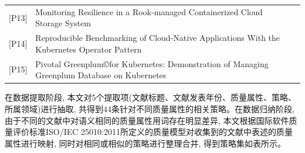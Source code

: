{\begin{longtable}[h]{m{40pt} m{280pt} m{40pt}<{\centering}}
        [P13]&Monitoring Resilience in a Rook-managed Containerized Cloud Storage System&\cite{baumann2019monitoring}\\
        
        [P14]&Reproducible Benchmarking of Cloud-Native Applications With the Kubernetes Operator Pattern&\cite{henning2021reproducible}\\
        
        [P15]&Pivotal Greenplum©for Kubernetes: Demonstration of Managing Greenplum Database on Kubernetes&\cite{patel2019pivotal}\\
        \bottomrule
    \end{longtable}
}

在数据提取阶段, 本文对5个提取项(文献标题、文献发表年份、质量属性、策略、所属领域)进行抽取, 共得到44条针对不同质量属性的相关策略。在数据归纳阶段, 由于不同的文献中对语义相同的质量属性用词存在明显差异, 本文根据国际软件质量评价标准ISO/IEC 25010:2011\footnotemark[1]所定义的质量模型对收集到的文献中表述的质量属性进行映射, 同时对相同或相似的策略进行整理合并, 得到策略集如表所示。

